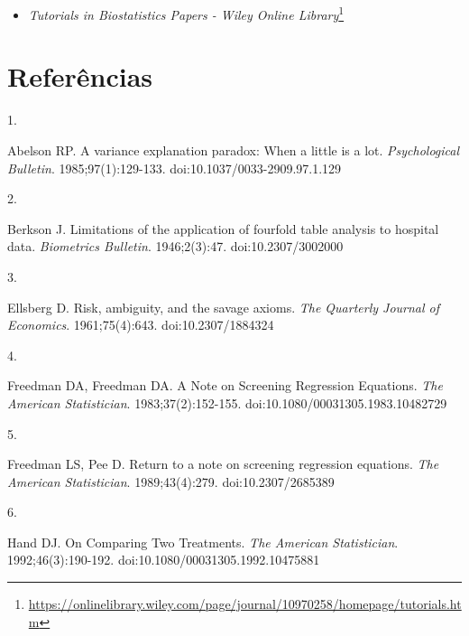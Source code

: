 \documentclass[
]{book}
\providecommand{\tightlist}{%
  \setlength{\itemsep}{0pt}\setlength{\parskip}{0pt}}
\newlength{\cslhangindent}
\newlength{\csllabelwidth}
\newlength{\cslentryspacingunit} %
\newenvironment{CSLReferences}[2] %
 {%
  \setlength{\parindent}{0pt}
  \ifodd #1
  \let\oldpar\par
  \def\par{\hangindent=\cslhangindent\oldpar}
  \fi
  \setlength{\parskip}{#2\cslentryspacingunit}
 }%
 {}
\newcommand{\CSLLeftMargin}[1]{\parbox[t]{\csllabelwidth}{#1}}
\newcommand{\CSLRightInline}[1]{\parbox[t]{\linewidth - \csllabelwidth}{#1}\break}
\renewcommand{\href}[2]{#2\footnote{\url{#1}}}
\newcommand{\DisableFootNotes}{%
  \renewcommand{\footnote}[2][]{\relax}
}
\begin{document}
\begin{itemize}
\tightlist
\item
  \href{https://onlinelibrary.wiley.com/page/journal/10970258/homepage/tutorials.htm}{\emph{Tutorials in Biostatistics Papers - Wiley Online Library}}
\end{itemize}

\hypertarget{referuxeancias}{%
\chapter*{\texorpdfstring{\textbf{Referências}}{Referências}}\label{referuxeancias}}

\DisableFootNotes

\hypertarget{refs}{}
\begin{CSLReferences}{0}{0}
\leavevmode{}%
\CSLLeftMargin{1. }%
\CSLRightInline{Abelson RP. A variance explanation paradox: When a little is a lot. \emph{Psychological Bulletin}. 1985;97(1):129-133. doi:\href{https://doi.org/10.1037/0033-2909.97.1.129}{10.1037/0033-2909.97.1.129}}

\leavevmode{}%
\CSLLeftMargin{2. }%
\CSLRightInline{Berkson J. Limitations of the application of fourfold table analysis to hospital data. \emph{Biometrics Bulletin}. 1946;2(3):47. doi:\href{https://doi.org/10.2307/3002000}{10.2307/3002000}}

\leavevmode{}%
\CSLLeftMargin{3. }%
\CSLRightInline{Ellsberg D. Risk, ambiguity, and the savage axioms. \emph{The Quarterly Journal of Economics}. 1961;75(4):643. doi:\href{https://doi.org/10.2307/1884324}{10.2307/1884324}}

\leavevmode{}%
\CSLLeftMargin{4. }%
\CSLRightInline{Freedman DA, Freedman DA. A Note on Screening Regression Equations. \emph{The American Statistician}. 1983;37(2):152-155. doi:\href{https://doi.org/10.1080/00031305.1983.10482729}{10.1080/00031305.1983.10482729}}

\leavevmode{}%
\CSLLeftMargin{5. }%
\CSLRightInline{Freedman LS, Pee D. Return to a note on screening regression equations. \emph{The American Statistician}. 1989;43(4):279. doi:\href{https://doi.org/10.2307/2685389}{10.2307/2685389}}

\leavevmode{}%
\CSLLeftMargin{6. }%
\CSLRightInline{Hand DJ. On Comparing Two Treatments. \emph{The American Statistician}. 1992;46(3):190-192. doi:\href{https://doi.org/10.1080/00031305.1992.10475881}{10.1080/00031305.1992.10475881}}


\end{CSLReferences}
\end{document}
